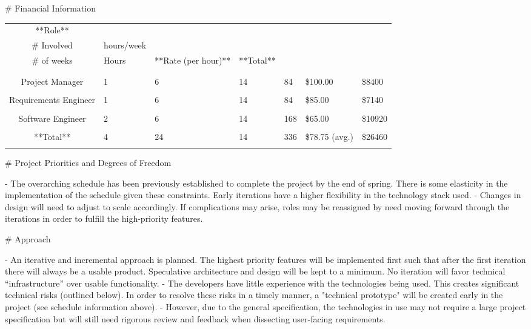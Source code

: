 \documentclass{article}
\begin{document}
\begin{markdown}
\newpage
# Financial Information
\begin{center}
\begin{tabular}{|c|l|l|l|l|l|l|}
\hline 
**Role** & \\# Involved & hours/week & \\# of weeks & Hours & **Rate (per hour)** & **Total**  \\\\
\hline \\
Project Manager       & 1           & 6                          & 14          & 84          & \$100.00                                      & \$8400       \\\\ \hline
Requirements Engineer & 1           & 6                          & 14          & 84          & \$85.00                                       & \$7140       \\\\ \hline
Software Engineer     & 2           & 6                          & 14          & 168         & \$65.00                                       & \$10920       \\\\ \hline
**Total**             & 4           & 24                         & 14          & 336         & \$78.75 (avg.)                                & \$26460       \\\\ \hline
\end{tabular}
\end{center}

# Project Priorities and Degrees of Freedom

- The overarching schedule has been previously established to complete the project by the end of spring. There is some elasticity in the implementation of the schedule given these constraints. Early iterations have a higher flexibility in the technology stack used. 
- Changes in design will need to adjust to scale accordingly. If complications may arise, roles may be reassigned by need moving forward through the iterations in order to fulfill the high-priority features.


# Approach

- An iterative and incremental approach is planned. The highest priority features will be implemented first such that after the first iteration there will always be a usable product. Speculative architecture and design will be kept to a minimum. No iteration will favor technical “infrastructure” over usable functionality.
- The developers have little experience with the technologies being used. This creates significant technical risks (outlined below). In order to resolve these risks in a timely manner, a "technical prototype" will be created early in the project (see schedule information above).
- However, due to the general specification, the technologies in use may not require a large project specification but will still need rigorous review and feedback when dissecting user-facing requirements.



\end{markdown}
\end{document}
